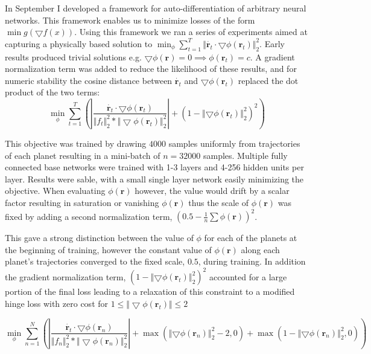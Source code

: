 \documentclass[10pt,letterpaper]{report}
\author{Brandon Houghton}
\begin{document}
In September I developed a framework for auto-differentiation of arbitrary neural networks. This framework enables us to minimize losses of the form $\min{g(\bigtriangledown f(x))} $. Using this framework we ran a series of experiments aimed at capturing a physically based solution to $ \min_{\phi} \sum^{T}_{t = 1} \Vert \dot{\pmb{r}_t} \cdot \bigtriangledown \phi \left( \pmb{r}_t \right) \Vert^2_2 $.
Early results produced trivial solutions e.g. $\bigtriangledown \phi(\pmb{r}) = 0 \implies \phi(\pmb{r}_t) = c$. A gradient normalization term was added to reduce the likelihood of these results, and for numeric stability the cosine distance between $\dot{\pmb{r}_t}$ and $\bigtriangledown \phi (\pmb{r}_t)$ replaced the dot product of the two terms:
$$ 
\min_{\phi} \sum^{T}_{t = 1} 
\left( \left\vert
\frac{\dot{\pmb{r}_t} \cdot \bigtriangledown \phi \left( \pmb{r}_t \right)}{{\Vert f_t \Vert}^2_2 * {\Vert \bigtriangledown \phi (\pmb{r}_t) \Vert}^2_2}
\right \vert
+ \left( 1-\left\Vert \bigtriangledown \phi \left( \pmb{r}_t \right) \right\Vert^2_2 \right)^2 \right)
$$

This objective was trained by drawing $4000$ samples uniformly from trajectories of each planet resulting in a mini-batch of $n = 32000$ samples. Multiple fully connected base networks were trained with 1-3 layers and 4-256 hidden units per layer. Results were sable, with a small single layer network easily minimizing the objective. 
When evaluating $\phi(\pmb{r})$ however, the value would drift by a scalar factor resulting in saturation or vanishing $\phi(\pmb{r})$ thus the scale of $\phi(\pmb{r})$ was fixed by adding a second normalization term, $( 0.5 - \frac{1}{n}\sum\phi(\pmb{r}))^2$.

This gave a strong distinction between the value of $\phi$ for each of the planets at the beginning of training, however the constant value of $\phi(\pmb{r})$ along each planet's trajectories converged to the fixed scale, $0.5$, during training. In addition the gradient normalization term, $( 1-\left\Vert \bigtriangledown \phi \left( \pmb{r}_t \right) \right\Vert^2_2 )^2$ accounted for a large portion of the final loss leading to a relaxation of this constraint to a modified hinge loss with zero cost for $ 1 \leq \Vert \bigtriangledown \phi \left( \pmb{r}_t \right) \Vert \leq 2$

$$ 
\min_{\phi} \sum^{N}_{n = 1} 
\left( 
	\left\vert
	\frac{\dot{\pmb{r}_t} \cdot \bigtriangledown \phi \left( \pmb{r}_n \right)}{{\Vert f_n \Vert}^2_2 * {\Vert \bigtriangledown \phi (\pmb{r}_n) \Vert}^2_2}
	\right \vert
+ \max{\left(\left\Vert \bigtriangledown \phi \left( \pmb{r}_n \right) \right\Vert^2_2 - 2, 0\right)}
+ \max{\left(1 - \left\Vert \bigtriangledown \phi \left( \pmb{r}_n \right) \right\Vert^2_2, 0\right)}
\right)
$$
\end{document}
